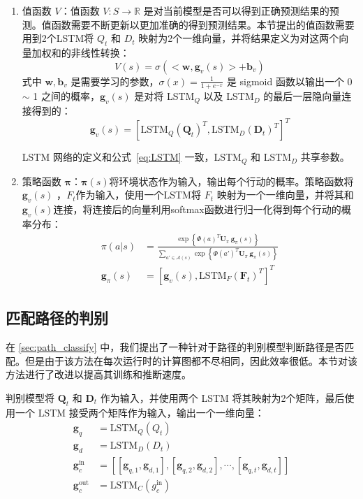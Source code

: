 \begin{enumerate}
	\item 值函数 $V$：值函数 $V: S\rightarrow \mathbb{R}$ 是对当前模型是否可以得到正确预测结果的预测。值函数需要不断更新以更加准确的得到预测结果。本节提出的值函数需要用到2个LSTM将 $Q_t$ 和 $D_t$ 映射为2个一维向量，并将结果定义为对这两个向量加权和的非线性转换：
\begin{equation}
\label{eq:MCTS_value}
V(s) = \sigma (<\mathbf{w}, \mathbf{g}_v(s)> + \mathbf{b}_v)
\end{equation}
式中 $\mathbf{w}, \mathbf{b}_v$ 是需要学习的参数，$
\sigma(x) = \frac{1}{1+e^{-x}}$ 是 sigmoid 函数以输出一个 0 $\sim$ 1 之间的概率，$\mathbf{g}_v(s)$ 是对将 LSTM$_Q$ 以及 LSTM$_D$ 的最后一层隐向量连接得到的：
\begin{equation}
\mathbf{g}_v(s) = [\mathrm{LSTM}_Q(\mathbf{Q}_t)^T, \mathrm{LSTM}_D(\mathbf{D}_{t})^T]^T
\end{equation}

LSTM 网络的定义和公式~\ref{eq:LSTM} 一致，LSTM$_Q$ 和 LSTM$_D$ 共享参数。

	\item 策略函数 $\mathbf{\pi}$：$\mathbf{\pi}(s)$将环境状态作为输入，输出每个行动的概率。策略函数将 $\mathbf{g}_v(s)$ ，$F_t$作为输入，使用一个LSTM将	$F_t$ 映射为一个一维向量，并将其和$\mathbf{g}_v(s)$连接，将连接后的向量利用softmax函数进行归一化得到每个行动的概率分布：
\begin{equation}
\label{eq:MCTS_policy}
\begin{aligned}
\pi(a|s) &= \frac{\exp\left\{\Phi(a)^T \mathbf{U}_\pi ~\mathbf{g}_\pi(s)\right\}}{\sum_{a'\in\mathcal{A}(s)} \exp\left\{\Phi(a')^T \mathbf{U}_\pi ~\mathbf{g}_\pi(s)\right\}} \\
\mathbf{g}_\pi(s) &= [\mathbf{g}_v(s) , \mathrm{LSTM}_F(\mathbf{F}_{t})^T]^T
\end{aligned}
\end{equation}
	
\end{enumerate}

\subsection{匹配路径的判别}
在 \ref{sec:path_classify} 中，我们提出了一种针对于路径的判别模型判断路径是否匹配。但是由于该方法在每次运行时的计算图都不尽相同，因此效率很低。本节对该方法进行了改进以提高其训练和推断速度。

判别模型将 $\mathbf{Q}_t$ 和 $\mathbf{D}_t$ 作为输入，并使用两个 LSTM 将其映射为2个矩阵，最后使用一个 LSTM 接受两个矩阵作为输入，输出一个一维向量：
\begin{equation}
\label{eq:path_classification}
\begin{aligned}
\mathbf{g}_q &= \mathrm{LSTM}_Q(Q_t)\\
\mathbf{g}_d &= \mathrm{LSTM}_D(D_t)\\
\mathbf{g}_c^{\text{in}} &= [[\mathbf{g}_{q, 1}, \mathbf{g}_{d, 1}], [\mathbf{g}_{q, 2}, \mathbf{g}_{d, 2}], \cdots, [\mathbf{g}_{q, t}, \mathbf{g}_{d, t}]]\\
\mathbf{g}_c^{\text{out}} &= \mathrm{LSTM}_C({g}_c^{\text{in}})
\end{aligned}
\end{equation}

